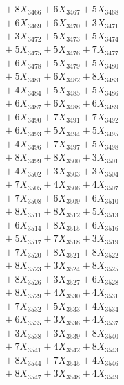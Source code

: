 \documentclass[a4paper,10pt]{article}
\begin{document}
{\begin{align}
&\;  + 8 X_{3466} + 6 X_{3467} + 5 X_{3468} \\[0.3ex]
&\;  + 6 X_{3469} + 6 X_{3470} + 3 X_{3471} \\[0.3ex]
&\;  + 3 X_{3472} + 5 X_{3473} + 5 X_{3474} \\[0.3ex]
&\;  + 5 X_{3475} + 5 X_{3476} + 7 X_{3477} \\[0.3ex]
&\;  + 6 X_{3478} + 5 X_{3479} + 5 X_{3480} \\[0.3ex]
&\;  + 5 X_{3481} + 6 X_{3482} + 8 X_{3483} \\[0.3ex]
&\;  + 4 X_{3484} + 5 X_{3485} + 5 X_{3486} \\[0.3ex]
&\;  + 6 X_{3487} + 6 X_{3488} + 6 X_{3489} \\[0.5ex]\allowbreak
&\;  + 6 X_{3490} + 7 X_{3491} + 7 X_{3492} \\[0.3ex]
&\;  + 6 X_{3493} + 5 X_{3494} + 5 X_{3495} \\[0.3ex]
&\;  + 4 X_{3496} + 7 X_{3497} + 5 X_{3498} \\[0.3ex]
&\;  + 8 X_{3499} + 8 X_{3500} + 3 X_{3501} \\[0.3ex]
&\;  + 4 X_{3502} + 3 X_{3503} + 3 X_{3504} \\[0.3ex]
&\;  + 7 X_{3505} + 4 X_{3506} + 4 X_{3507} \\[0.3ex]
&\;  + 7 X_{3508} + 6 X_{3509} + 6 X_{3510} \\[0.3ex]
&\;  + 8 X_{3511} + 8 X_{3512} + 5 X_{3513} \\[0.3ex]
&\;  + 6 X_{3514} + 8 X_{3515} + 6 X_{3516} \\[0.3ex]
&\;  + 5 X_{3517} + 7 X_{3518} + 3 X_{3519} \\[0.5ex]\allowbreak
&\;  + 7 X_{3520} + 8 X_{3521} + 8 X_{3522} \\[0.3ex]
&\;  + 8 X_{3523} + 3 X_{3524} + 8 X_{3525} \\[0.3ex]
&\;  + 8 X_{3526} + 3 X_{3527} + 6 X_{3528} \\[0.3ex]
&\;  + 8 X_{3529} + 4 X_{3530} + 4 X_{3531} \\[0.3ex]
&\;  + 7 X_{3532} + 5 X_{3533} + 4 X_{3534} \\[0.3ex]
&\;  + 6 X_{3535} + 3 X_{3536} + 4 X_{3537} \\[0.3ex]
&\;  + 3 X_{3538} + 3 X_{3539} + 8 X_{3540} \\[0.3ex]
&\;  + 7 X_{3541} + 4 X_{3542} + 8 X_{3543} \\[0.3ex]
&\;  + 8 X_{3544} + 7 X_{3545} + 4 X_{3546} \\[0.3ex]
&\;  + 8 X_{3547} + 3 X_{3548} + 4 X_{3549} \\[0.5ex]\allowbreak

\end{align}}
\end{document}
